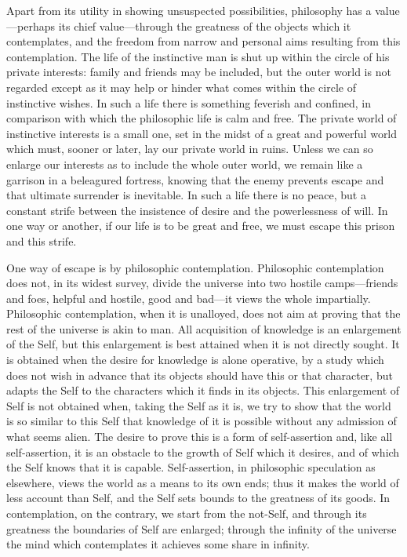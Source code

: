 Apart from its utility in showing unsuspected possibilities,
philosophy has a val\-ue---perhaps its chief val\-ue---through the
greatness of the objects which it contemplates, and the freedom from
narrow and personal aims resulting from this contemplation. The life
of the instinctive man is shut up within the circle of his private
interests: family and friends may be included, but the outer world is
not regarded except as it may help or hinder what comes within the
circle of instinctive wishes. In such a life there is something
feverish and confined, in comparison with which the philosophic life
is calm and free. The private world of instinctive interests is a
small one, set in the midst of a great and powerful world which must,
sooner or later, lay our private world in ruins. Unless we can so
enlarge our interests as to include the whole outer world, we remain
like a garrison in a beleagured fortress, knowing that the enemy
prevents escape and that ultimate surrender  is inevitable.
In such a life there is no peace, but a constant strife between the
insistence of desire and the powerlessness of will. In one way or
another, if our life is to be great and free, we must escape this
prison and this strife.

One way of escape is by philosophic contemplation. Philosophic
contemplation does not, in its widest survey, divide the universe into
two hostile camps---friends and foes, helpful and hostile, good and
bad---it views the whole impartially. Philosophic contemplation, when
it is unalloyed, does not aim at proving that the rest of the universe
is akin to man. All acquisition of knowledge is an enlargement of the
Self, but this enlargement is best attained when it is not directly
sought. It is obtained when the desire for knowledge is alone
operative, by a study which does not wish in advance that its objects
should have this or that character, but adapts the Self to the
characters which it finds in its objects. This enlargement of Self is
not obtained when, taking the Self as it is, we try to show that the
world is so similar  to this Self that knowledge of it is
possible without any admission of what seems alien. The desire to
prove this is a form of self-assertion and, like all self-assertion,
it is an obstacle to the growth of Self which it desires, and of which
the Self knows that it is capable. Self-assertion, in philosophic
speculation as elsewhere, views the world as a means to its own ends;
thus it makes the world of less account than Self, and the Self sets
bounds to the greatness of its goods. In contemplation, on the
contrary, we start from the not-Self, and through its greatness the
boundaries of Self are enlarged; through the infinity of the universe
the mind which contemplates it achieves some share in infinity.

